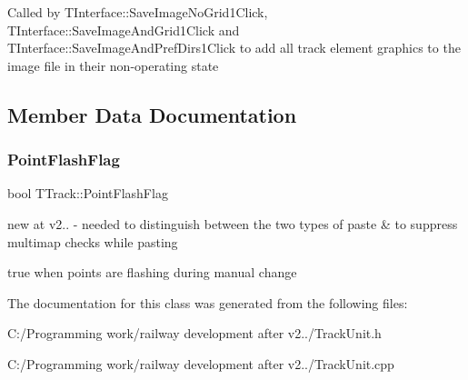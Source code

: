 Called by T\+Interface\+::\+Save\+Image\+No\+Grid1\+Click, T\+Interface\+::\+Save\+Image\+And\+Grid1\+Click and T\+Interface\+::\+Save\+Image\+And\+Pref\+Dirs1\+Click to add all track element graphics to the image file in their non-\/operating state 

\subsection{Member Data Documentation}
\mbox{\label{class_t_track_a50f518fa93ef56b1570e4102fb691e14}} 
\subsubsection{\texorpdfstring{Point\+Flash\+Flag}{PointFlashFlag}}
{\footnotesize\ttfamily bool T\+Track\+::\+Point\+Flash\+Flag}



new at v2.. -\/ needed to distinguish between the two types of paste \& to suppress multimap checks while pasting 

true when points are flashing during manual change 

The documentation for this class was generated from the following files\+:\begin{DoxyCompactItemize}
\item 
C\+:/\+Programming work/railway development after v2../Track\+Unit.\+h\item 
C\+:/\+Programming work/railway development after v2../Track\+Unit.\+cpp\end{DoxyCompactItemize}
